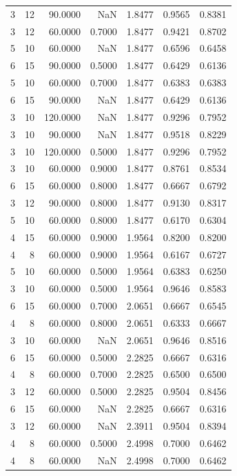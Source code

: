 \begin{tabular}{rrrrrrr}
3 & 12 & 90.0000 & NaN & 1.8477 & 0.9565 & 0.8381 \\
3 & 12 & 60.0000 & 0.7000 & 1.8477 & 0.9421 & 0.8702 \\
5 & 10 & 60.0000 & NaN & 1.8477 & 0.6596 & 0.6458 \\
6 & 15 & 90.0000 & 0.5000 & 1.8477 & 0.6429 & 0.6136 \\
5 & 10 & 60.0000 & 0.7000 & 1.8477 & 0.6383 & 0.6383 \\
6 & 15 & 90.0000 & NaN & 1.8477 & 0.6429 & 0.6136 \\
3 & 10 & 120.0000 & NaN & 1.8477 & 0.9296 & 0.7952 \\
3 & 10 & 90.0000 & NaN & 1.8477 & 0.9518 & 0.8229 \\
3 & 10 & 120.0000 & 0.5000 & 1.8477 & 0.9296 & 0.7952 \\
3 & 10 & 60.0000 & 0.9000 & 1.8477 & 0.8761 & 0.8534 \\
6 & 15 & 60.0000 & 0.8000 & 1.8477 & 0.6667 & 0.6792 \\
3 & 12 & 90.0000 & 0.8000 & 1.8477 & 0.9130 & 0.8317 \\
5 & 10 & 60.0000 & 0.8000 & 1.8477 & 0.6170 & 0.6304 \\
4 & 15 & 60.0000 & 0.9000 & 1.9564 & 0.8200 & 0.8200 \\
4 & 8 & 60.0000 & 0.9000 & 1.9564 & 0.6167 & 0.6727 \\
5 & 10 & 60.0000 & 0.5000 & 1.9564 & 0.6383 & 0.6250 \\
3 & 10 & 60.0000 & 0.5000 & 1.9564 & 0.9646 & 0.8583 \\
6 & 15 & 60.0000 & 0.7000 & 2.0651 & 0.6667 & 0.6545 \\
4 & 8 & 60.0000 & 0.8000 & 2.0651 & 0.6333 & 0.6667 \\
3 & 10 & 60.0000 & NaN & 2.0651 & 0.9646 & 0.8516 \\
6 & 15 & 60.0000 & 0.5000 & 2.2825 & 0.6667 & 0.6316 \\
4 & 8 & 60.0000 & 0.7000 & 2.2825 & 0.6500 & 0.6500 \\
3 & 12 & 60.0000 & 0.5000 & 2.2825 & 0.9504 & 0.8456 \\
6 & 15 & 60.0000 & NaN & 2.2825 & 0.6667 & 0.6316 \\
3 & 12 & 60.0000 & NaN & 2.3911 & 0.9504 & 0.8394 \\
4 & 8 & 60.0000 & 0.5000 & 2.4998 & 0.7000 & 0.6462 \\
4 & 8 & 60.0000 & NaN & 2.4998 & 0.7000 & 0.6462 \\
\bottomrule
\end{tabular}
